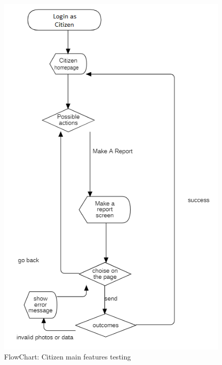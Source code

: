 \begin{figure}[H]
\centering
\includegraphics{Images/FlowChartCitizen.png}
\caption{\label{fig:ComWI}FlowChart: Citizen main features testing}
\end{figure}
\newpage
